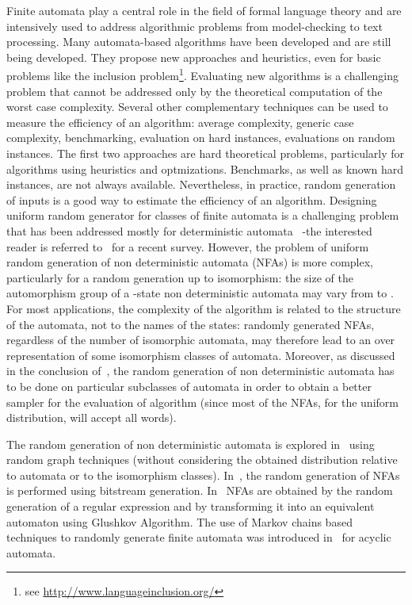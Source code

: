 

Finite automata play a central role in the field of formal language
theory and are intensively used to address algorithmic problems from
model-checking to text processing. Many automata-based algorithms have been
developed and are still  being developed. They propose new approaches and heuristics,
even for basic problems like the inclusion
problem\footnote{see \url{http://www.languageinclusion.org/}}.
Evaluating new algorithms is a challenging problem that cannot be addressed
only by the theoretical computation of the worst case complexity. Several
other complementary techniques can be used to measure the efficiency of an
algorithm: average complexity, generic case complexity, benchmarking,
evaluation on hard instances, evaluations on random instances. The first two
approaches are hard theoretical problems, particularly for algorithms
using heuristics and optmizations. Benchmarks, as well as known hard instances, are not always available. 
Nevertheless, in practice, random generation
of inputs is a good way to estimate the efficiency of an algorithm.
Designing uniform random generator for classes of finite automata is a
challenging problem that has been addressed mostly for deterministic
automata~\cite{DBLP:journals/tcs/ChamparnaudP05,DBLP:journals/tcs/BassinoN07,DBLP:journals/tcs/AlmeidaMR07,DBLP:conf/stacs/CarayolN12}
 -the interested reader is referred to~\cite{DBLP:conf/mfcs/Nicaud14} for a
recent survey. However, the problem of uniform random generation of non
deterministic automata (NFAs) is more complex, particularly for a random generation
up to isomorphism: the size of the automorphism group of a -state non
deterministic automata may vary from  to . 
For most applications, the complexity of the algorithm is related to the
structure of the automata, not to the names of the states:
randomly generated NFAs, regardless of the number of isomorphic automata, may therefore 
lead to an over representation of some isomorphism classes of automata.
Moreover, as discussed in the conclusion of~\cite{DBLP:conf/mfcs/Nicaud14},
the random generation of non deterministic automata has to be done on particular
subclasses of automata in order to obtain a better sampler for the
evaluation of algorithm (since most of the NFAs, for the uniform distribution,
will accept all words).  

The random generation of non deterministic automata is explored
in~\cite{DBLP:conf/lpar/TabakovV05} using random graph techniques (without
considering the obtained distribution relative to automata or to the
isomorphism classes). In~\cite{DBLP:conf/dcfs/ChamparnaudHPZ02}, the random
generation of NFAs is performed using bitstream generation.
In~\cite{DBLP:conf/lata/Nicaud09,DBLP:conf/fsttcs/NicaudPR10} NFAs are
obtained by the random generation of a regular expression and by
transforming it into an equivalent automaton using Glushkov Algorithm. The
use of Markov chains based techniques to randomly generate finite automata
was introduced
in~\cite{DBLP:conf/wia/CarninoF11,DBLP:journals/tcs/CarninoF12} for acyclic
automata.


